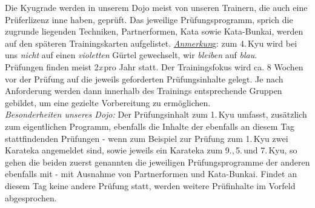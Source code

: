 \begin{center}
{\begin{center}
		\end{center}

		Die Kyugrade werden in unserem Dojo meist von unseren Trainern, die auch eine Prüferlizenz inne haben, geprüft. Das jeweilige Prüfungsprogramm, sprich die zugrunde liegenden Techniken, Partnerformen, Kata sowie Kata-Bunkai, werden auf den späteren Trainingskarten aufgelistet. \textit{\underline{Anmerkun}}g: zum 4.\,Kyu wird bei uns \textit{nicht} auf einen \textit{violetten} Gürtel gewechselt, wir \textit{bleiben} auf \textit{blau}.\\

		Prüfungen finden meist 2\textit{x}\,pro Jahr statt. Der Trainingsfokus wird ca. 8 Wochen vor der Prüfung auf die jeweils geforderten Prüfungsinhalte gelegt. Je nach Anforderung werden dann innerhalb des Trainings entsprechende Gruppen gebildet, um eine gezielte Vorbereitung zu ermöglichen.\\

		\textit{Besonderheiten unseres Dojo:} Der Prüfungsinhalt zum 1.\,Kyu umfasst, zusätzlich zum eigentlichen Programm, ebenfalls die Inhalte der ebenfalls an diesem Tag stattfindenden Prüfungen - wenn zum Beispiel zur Prüfung zum 1.\,Kyu zwei Karateka angemeldet sind, sowie jeweils ein Karateka zum 9.,\,5.\,und 7.\,Kyu, so gehen die beiden zuerst genannten die jeweiligen Prüfungsprogramme der anderen ebenfalls mit - mit Ausnahme von Partnerformen und Kata-Bunkai. Findet an diesem Tag keine andere Prüfung statt, werden weitere Prüfinhalte im Vorfeld abgesprochen.
	}
	\end{center}\null\vfill\null
	\setlength{\tabcolsep}{6pt}